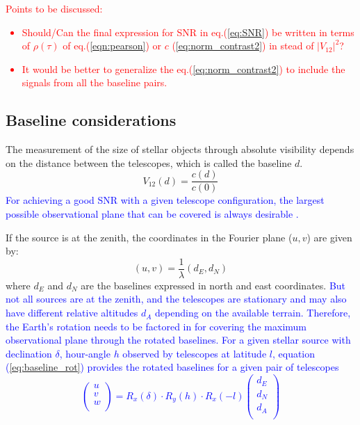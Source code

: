 \textcolor{red}{Points to be discussed: 
\begin{itemize}
\item{Should/Can the final expression for SNR in eq.(\ref{eq:SNR}) be written in terms of $\rho(\tau)$ of eq.(\ref{eqn:pearson}) or $c$ (\ref{eq:norm_contrast2}) in stead of $\vert V_{12}\vert^2$?}
\item{It would be better to generalize the eq.(\ref{eq:norm_contrast2}) to include the signals from all the baseline pairs.}
\end{itemize}}
\subsection{Baseline considerations}
The measurement of the size of stellar objects through absolute visibility depends on the distance between the telescopes, which is called the baseline $d$. 
\begin{equation}
	V_{12}(d) = \frac{c(d)}{c(0)}
	\label{eq:angular_size_meas}
\end{equation}
\textcolor{blue}{For achieving a good SNR with a given telescope configuration, the largest possible observational plane that can be covered is always desirable \citep{acciari2020optical, abeysekara2020demonstration}.}

If the source is at the zenith, the coordinates in the Fourier plane ($u,v$) are given by:
\begin{equation}
	(u,v) = \frac{1}{\lambda} (d_E, d_N)
\end{equation}
where $d_E$ and $d_N$ are the baselines expressed in north and east coordinates. 
\textcolor{blue}{But not all sources are at the zenith, and the telescopes are stationary and may also have different relative altitudes $d_A$ depending on the available terrain. Therefore, the Earth's rotation needs to be factored in for covering the maximum observational plane through the rotated baselines. 
For a given stellar source with declination $\delta$, hour-angle $h$ observed by telescopes at latitude $l$, equation (\ref{eq:baseline_rot}) provides the rotated
baselines for a given pair of telescopes \citep{dravins2013optical, saha2020theory}
\begin{equation}
\begin{pmatrix} u\\ v\\ w\\ \end{pmatrix} = R_x(\delta) \cdot R_y(h) \cdot R_x(-l) \begin{pmatrix} d_E \\ d_N \\ d_A \\ \end{pmatrix}
	\label{eq:baseline_rot}
\end{equation}
}
